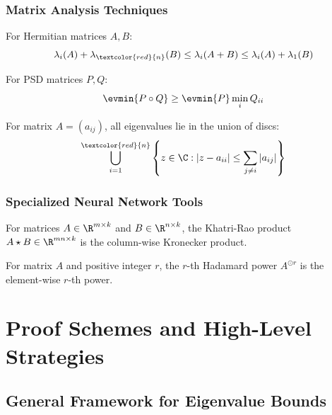 \subsubsection{Matrix Analysis Techniques}

\begin{lemma}
For Hermitian matrices $A, B$:
$$\lambda_i(A) + \lambda_{\textcolor{red}{n}}(B) \leq \lambda_i(A + B) \leq \lambda_i(A) + \lambda_1(B)$$
\end{lemma}

\begin{lemma}
For PSD matrices $P, Q$:
$$\evmin{P \circ Q} \geq \evmin{P} \min_i Q_{ii}$$
\end{lemma}

\begin{lemma}
For matrix $A = (a_{ij})$, all eigenvalues lie in the union of discs:
$$\bigcup_{i=1}^{\textcolor{red}{n}} \left\{z \in \C : |z - a_{ii}| \leq \sum_{j \neq i} |a_{ij}|\right\}$$
\end{lemma}

\subsubsection{Specialized Neural Network Tools}

\begin{definition}
For matrices $A \in \R^{m \times k}$ and $B \in \R^{n \times k}$, the Khatri-Rao product $A \star B \in \R^{mn \times k}$ is the column-wise Kronecker product.
\end{definition}

\begin{definition}
For matrix $A$ and positive integer $r$, the $r$-th Hadamard power $A^{\odot r}$ is the element-wise $r$-th power.
\end{definition}

\newpage

\section{Proof Schemes and High-Level Strategies}

\subsection{General Framework for Eigenvalue Bounds}

